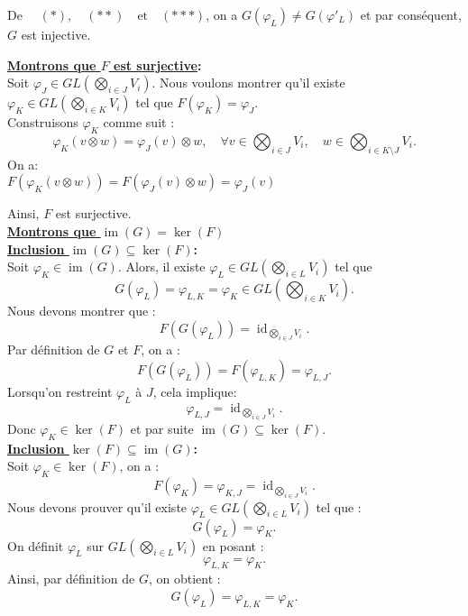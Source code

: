 \documentclass[a4paper, 14pt]{report}
\begin{document}
\begin{onehalfspace}
{			
			
			De \( \quad (*),\quad (**) \quad \text{et} \quad (***)\), on a \( G(\varphi_{L}) \neq G(\varphi{'}_{L})\) et par conséquent, \(G\) est injective.
			
			
			\textbf{\underline{Montrons que \(F\) est surjective}:}\\
			
			Soit $\varphi_{J} \in GL(\bigotimes_{i\in J} V_i)$. Nous voulons montrer qu'il existe $\varphi_{K} \in GL(\bigotimes_{i\in K} V_i)$ tel que \(F(\varphi_{K}) = \varphi_{J}.\)\\
			Construisons $\varphi_{K}$ comme suit :
			\[
			\varphi_{K}(v \otimes w) = \varphi_{J}(v) \otimes w, \quad \forall v \in \bigotimes_{i\in J} V_i, \quad w \in \bigotimes_{i\in K \setminus J} V_i.
			\]
			On a: \\
			\(
			F(\varphi_{K}(v \otimes w)) = F(\varphi_{J}(v) \otimes w) =  \varphi_{J}(v)
			\)
			
			Ainsi, $F$ est surjective.\\
			
			
			
			
			\textbf{\underline{Montrons que $\operatorname{im}(G) = \ker(F)$}}\\
			
			\textbf{\underline{Inclusion \( \operatorname{im}(G) \subseteq \ker(F) \)}:}\\
			Soit \(\varphi_{K} \in \operatorname{im}(G) \). Alors, il existe
			\( \varphi_{L} \in GL\left(\bigotimes_{i\in L} V_i\right) \) tel que
			\[
			G(\varphi_{L}) = \varphi_{L,K} = \varphi_{K} \in GL\left(\bigotimes_{i\in K} V_i\right).
			\]
			Nous devons montrer que :
			\[
			F(G(\varphi_{L})) = \operatorname{id}_{\bigotimes_{i\in J} V_i}.
			\]
			Par définition de \( G \) et \( F \), on a :
			\[
			F(G(\varphi_{L})) = F(\varphi_{L,K}) = \varphi_{L,J}.
			\]
			Lorsqu'on restreint  \( \varphi_{L} \) à \( J \), cela implique:
			\[
			\varphi_{L,J} = \operatorname{id}_{\bigotimes_{i\in J} V_i}.
			\]
			Donc \( \varphi_{K} \in \ker(F) \) et par suite 
			\( \operatorname{im}(G) \subseteq \ker(F).\)\\
			
			
			\textbf{\underline{Inclusion \( \ker(F) \subseteq \operatorname{im}(G) \)}:}\\
			
			Soit \( \varphi_{K} \in \ker(F) \), on a :
			\[
			F(\varphi_{K}) = \varphi_{K,J} = \operatorname{id}_{\bigotimes_{i\in J} V_i}.
			\]
			Nous devons prouver qu'il existe \( \varphi_{L} \in GL\left(\bigotimes_{i\in L} V_i\right) \) tel que :
			\[
			G(\varphi_{L}) =  \varphi_{K} .
			\]
			On définit \( \varphi_{L} \) sur \( GL(\bigotimes_{i\in L} V_i) \) en posant :
			\[
			\varphi_{L,K} = \varphi_{K} .
			\]
			Ainsi, par définition de \( G \), on obtient :
			\[
			G(\varphi_{L}) = \varphi_{L,K} = \varphi_{K}.
			\]
			
}
\end{onehalfspace}
\end{document}
